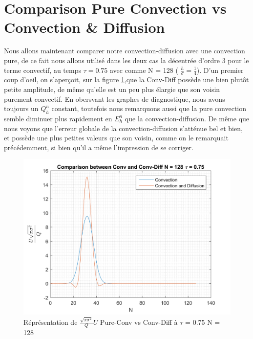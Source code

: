 \documentclass{article}
\begin{document}
\section{Comparison Pure Convection vs Convection \& Diffusion}
Nous allons maintenant comparer notre convection-diffusion avec une convection pure, de ce fait nous allons utilisé dans les deux cas la décentrée d'ordre 3 pour le terme convectif, au temps $\tau = 0.75$ avec comme N = 128 ( $\frac{h}{\sigma} = \frac{1}{4}$). D'un premier coup d'oeil, on s'aperçoit, sur la figure \ref{fig8a},que la Conv-Diff possède une bien plutôt petite amplitude, de même qu'elle est un peu plus élargie que son voisin purement convectif. En obersvant les graphes de diagnostique, nous avons toujours un $Q_h^n$ constant, toutefois nous remarquons aussi que la pure convection semble diminuer plus rapidement en $E_h^n$ que la convection-diffusion. De même que nous voyons que l'erreur globale de la convection-diffusion s'atténue  bel et bien, et possède une plus petites valeurs que son voisin, comme on le remarquait précédemment, si bien qu'il a même l'impression de se corriger.
\begin{figure}[H]
    \centering
    \includegraphics[scale=0.45]{img/fig8a.png}
    \caption{Réprésentation de $\frac{\sqrt{\pi \sigma^2}}{Q} U$  Pure-Conv vs Conv-Diff à $\tau$ = 0.75 N = 128}
    \label{fig8a}
\end{figure}
\end{document}

